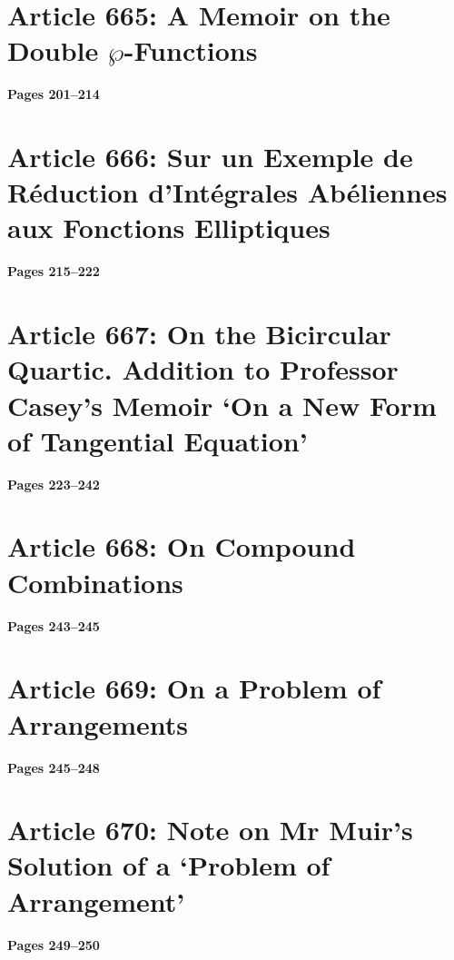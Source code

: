 \documentclass[11pt,a4paper]{book}
\begin{document}
\newpage


\section*{Article 665: A Memoir on the Double $\wp$-Functions}
\textbf{Pages 201--214}\\[0.5cm]

\section*{Article 666: Sur un Exemple de R\'eduction d'Int\'egrales Ab\'eliennes aux Fonctions Elliptiques}
\textbf{Pages 215--222}\\[0.5cm]

\section*{Article 667: On the Bicircular Quartic. Addition to Professor Casey's Memoir `On a New Form of Tangential Equation'}
\textbf{Pages 223--242}\\[0.5cm]

\section*{Article 668: On Compound Combinations}
\textbf{Pages 243--245}\\[0.5cm]

\section*{Article 669: On a Problem of Arrangements}
\textbf{Pages 245--248}\\[0.5cm]

\section*{Article 670: Note on Mr Muir's Solution of a `Problem of Arrangement'}
\textbf{Pages 249--250}\\[0.5cm]
\end{document}
